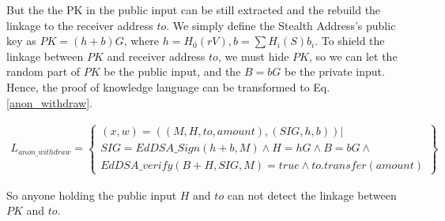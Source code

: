 But the the PK in the public input can be still extracted and the rebuild the linkage to the receiver address $to$.
We simply define the Stealth Address's public key as $PK = (h + b)G$, where $h = H_0(rV), b = \sum{H_i(S)b_i}$. To shield the linkage between $PK$ and receiver address $to$, we must hide $PK$, so we can let the random part of $PK$ be the public input, and the $B=bG$ be the private input. Hence, the proof of knowledge language can be transformed to Eq. \ref{anon_withdraw}.

\begin{equation}\label{anon_withdraw}
    \begin{aligned}
        L_{anon\_withdraw} = \left\{
                \begin{array}{c}
                        (x, w) = ((M, H, to, amount), (SIG, h, b)) | \\ 
                    SIG = EdDSA\_Sign(h+b, M) \land H = hG \land B = bG \land \\
                        EdDSA\_verify(B + H, SIG, M) = true \land to.transfer(amount)
                \end{array}    
                    \right\} 
    \end{aligned}
\end{equation}

So anyone holding the public input $H$ and $to$ can not detect the linkage between $PK$ and $to$.





